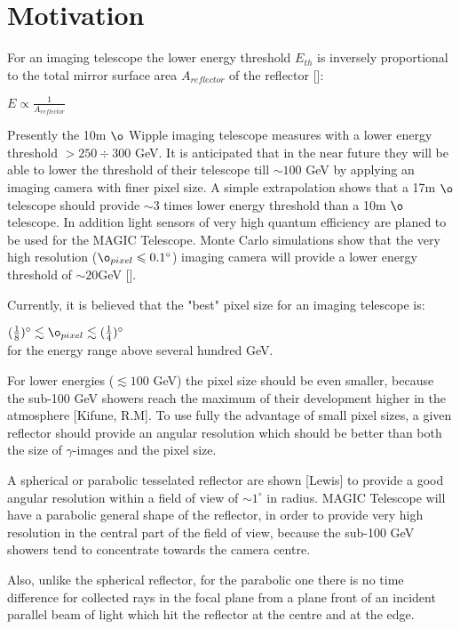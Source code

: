 \section{Motivation}

{\footnotesize 
For an imaging telescope the lower energy threshold $E_{th}$ is inversely proportional to the total mirror surface area $A_{reflector}$ of the reflector []:

\vspace{0.2cm}

\centerline {$E \varpropto \frac{1}{A_{reflector}}$}

\vspace{0.2cm}

Presently the 10m $\o $ Wipple imaging telescope measures with a lower energy threshold $ > 250 \div 300 $ GeV. It is anticipated that in the near future they will be able to lower the threshold of their telescope till $ \sim 100 $ GeV by applying an imaging camera with finer pixel size. A simple extrapolation shows that a 17m $\o $ telescope should provide $ \sim 3$ times lower energy threshold than a 10m $\o$ telescope. In addition light sensors of very high quantum efficiency are planed to be used for the MAGIC Telescope. Monte Carlo simulations show that the very high resolution ($\o_{pixel}   \leqslant 0.1^{\circ} $) imaging camera will provide a lower energy threshold of $\sim  20 $GeV [].

\vspace{1cm}

 Currently, it is believed that the "best" pixel size for an imaging telescope is:

 $(\frac{1}{8})^{\circ} \lesssim \o_{pixel} \lesssim (\frac{1}{4})^{\circ}$ \\ 
 for the energy range above several hundred GeV.

 For lower energies ($ \lesssim 100 $ GeV) the pixel size should be even smaller, because the sub-100 GeV showers reach the maximum of their development higher in the atmosphere [Kifune, R.M]. To use fully the advantage of small pixel sizes, a given reflector should provide an angular resolution which should be better than both the size of $\gamma$-images and the pixel size.

A spherical or parabolic tesselated reflector are shown  [Lewis] to provide a good angular resolution within a field of view of $ \sim 1^{\circ} $ in radius. MAGIC Telescope will have a parabolic general shape of the reflector, in order to provide very high resolution in the central part of the field of view, because the sub-100 GeV showers tend to  concentrate towards the camera centre.

Also, unlike the spherical reflector, for the parabolic one there is no time difference for collected rays in the focal plane from a plane front of an incident parallel beam of light which hit the reflector at the centre and at the edge. 

}
